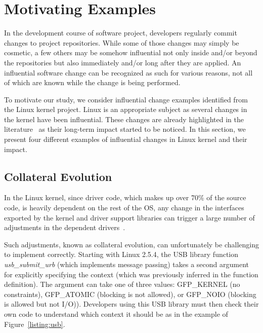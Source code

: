 \section{Motivating Examples}
\label{sec:motivation}


In the development course of software project, developers regularly commit
changes to project repositories. While some of those changes may simply be
cosmetic, a few others may be somehow influential not only inside and/or beyond
the repositories but also immediately and/or long after they are applied.
An influential software change can be recognized as such for various reasons, not
all of which are known while the change is being performed.


To motivate our study, we consider influential change 
examples identified from the Linux kernel project.
Linux is an appropriate subject as several changes in the kernel have
been influential. These changes are already highlighted in the literature~\cite{Palix10Faults,padioleau08} as
their long-term impact started to be noticed.
In this section, we present four different examples of influential changes in
Linux kernel and their impact.


\subsection{Collateral Evolution}
In the Linux kernel, since driver code, which makes up over 70\% of the source
code, is heavily dependent on the rest of the OS, any change in the interfaces
exported by the kernel and driver support libraries can trigger a large number
of adjustments in the dependent drivers~\cite{padioleau06}. 

Such adjustments,
known as collateral evolution, can unfortunately be challenging to implement
correctly. Starting with Linux 2.5.4, the USB library function {\em
usb\_submit\_urb} (which implements message passing) takes a second argument for
explicitly specifying the context (which was previously inferred in the
function definition). The argument can take one of three values: GFP\_KERNEL (no
constraints), GFP\_ATOMIC (blocking is not allowed), or GFP\_NOIO (blocking is
allowed but not I/O)). Developers using this USB library must then check their
own code to understand which context it should be as in the example of Figure~\ref{listing:usb}.

